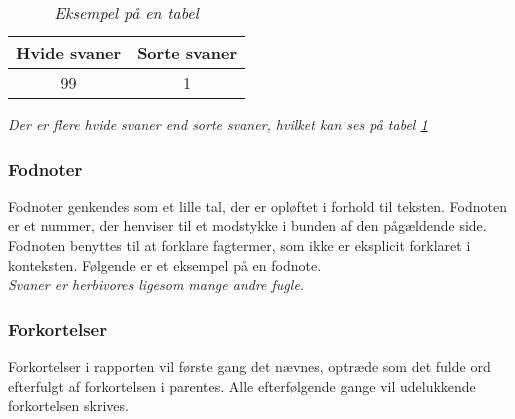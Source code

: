 \begin{table}[ht]
    \centering
    \begin{tabular}{ c c }
        \textbf{Hvide svaner} & \textbf{Sorte svaner} \\
        \midrule
        99 & 1 \\
    \end{tabular}
    \caption{\textit{Eksempel på en tabel}}
    \label{tab:abc}
\end{table}

\noindent \textit{Der er flere hvide svaner end sorte svaner, hvilket kan ses på tabel \ref{tab:abc}}




\subsubsection*{Fodnoter}
Fodnoter genkendes som et lille tal, der er opløftet i forhold til teksten. Fodnoten er et nummer, der henviser til et modstykke i bunden af den pågældende side. Fodnoten benyttes til at forklare fagtermer, som ikke er eksplicit forklaret i konteksten. Følgende er et eksempel på en fodnote.\\

\noindent \textit{Svaner er herbivores ligesom mange andre fugle.}

\subsubsection*{Forkortelser}
Forkortelser i rapporten vil første gang det nævnes, optræde som det fulde ord efterfulgt af forkortelsen i parentes. Alle efterfølgende gange vil udelukkende forkortelsen skrives. \\

